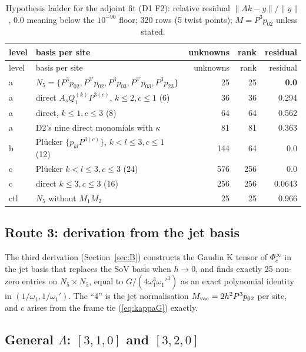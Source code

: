 \documentclass[11pt]{article}
\begin{document}
{\small
\begin{longtable}{llrrr}
\caption{Hypothesis ladder for the adjoint fit (D1 F2): relative residual $\lVert Ak-y\rVert/\lVert y\rVert$, $0.0$ meaning below the $10^{-90}$ floor; 320 rows (5 twist points); $M=P^3p_{02}$ unless stated.}\label{tab:ladder}\\
\toprule
level & basis per site & unknowns & rank & residual \\
\midrule
\endfirsthead
\toprule
level & basis per site & unknowns & rank & residual \\
\midrule
\endhead
\bottomrule
\endlastfoot
a & $N_5=\{P^3p_{02},P^{3\prime}p_{02},P^3p_{03},P^{3\prime}p_{03},P^3p_{23}\}$ & 25 & 25 & \textbf{0.0} \\
a & direct $A_sQ_1^{(k)}P^{3(c)}$, $k\le2,c\le1$ (6) & 36 & 36 & 0.294 \\
a & direct, $k\le1,c\le3$ (8) & 64 & 64 & 0.562 \\
a & D2's nine direct monomials with $\kappa$ & 81 & 81 & 0.363 \\
b & Plücker $\{p_{kl}P^{3(c)}\}$, $k<l\le3,c\le1$ (12) & 144 & 64 & 0.0 \\
c & Plücker $k<l\le3,c\le3$ (24) & 576 & 256 & 0.0 \\
c & direct $k\le3,c\le3$ (16) & 256 & 256 & 0.0643 \\
ctl & $N_5$ without $M_1M_2$ & 25 & 25 & 0.966 \\
\end{longtable}}


\subsection{Route 3: derivation from the jet basis}\label{sec:route3}

The third derivation (Section~\ref{sec:B}) constructs the Gaudin K tensor of $\Phi_c^\infty$ in the jet basis that replaces the SoV basis when $h\to0$, and finds exactly 25 non-zero entries on $N_5\times N_5$, equal to $G/(4\omega_1^3\omega_1'^3)$ as an exact polynomial identity in $(1/\omega_1,1/\omega_1')$. The ``4'' is the jet normalisation $M_{\rm vac}=2h^2P^3p_{02}$ per site, and $c$ arises from the frame tie (\ref{eq:kappaG}) exactly.

\subsection{General \texorpdfstring{$\Lambda$}{}: \texorpdfstring{$[3,1,0]$}{[3,1,0]} and \texorpdfstring{$[3,2,0]$}{[3,2,0]}}\label{sec:jetgen}
\end{document}
